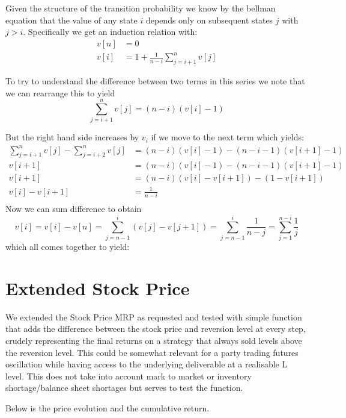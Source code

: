 \documentclass{article}[12pt]
\begin{document}
Given the structure of the transition probability we know by the bellman equation that the value of any state $i$ depends only on subsequent states $j$ with $j>i$. Specifically we get an induction relation with:
\begin{align*}
v[n] &= 0\\
v[i] &= 1 + \frac{1}{n-i}\sum_{j = i+1}^n v[j]
\end{align*}

To try to understand the difference between two terms in this series we note that we can rearrange this to yield
$$\sum_{j = i+1}^n v[j]  = (n-i)(v[i]-1)$$

But the right hand side increases by $v_i$ if we move to the next term which yields:
\begin{align*}
\sum_{j = i+1}^n v[j] - \sum_{j = i+2}^n v[j]  &= (n-i)(v[i]-1) - (n-i-1)(v[i+1]-1)\\
v[i+1] &= (n-i)(v[i]-1) -  (n-i-1)(v[i+1]-1)\\
v[i+1] &= (n-i)(v[i]-v[i+1]) - (1 - v[i+1])\\
v[i]-v[i+1] &= \frac{1}{n-i}\\
\end{align*}
Now we can sum difference to obtain  
$$ v[i] = v[i] - v[n] = \sum_{j=n-1}^{i}(v[j] -v[j+1]) = \sum_{j=n-1}^{i}\frac{1}{n-j} =  \sum_{j=1}^{n-i}\frac{1}{j}$$
which all comes together to yield:

\section{Extended Stock Price}

We extended the Stock Price MRP as requested and tested with simple function that adds the difference between the stock price and reversion level at every step, crudely representing the final returns on a strategy that always sold levels above the reversion level. This could be somewhat relevant for a party trading futures oscillation while having access to the underlying deliverable at a realisable L level. This does not take into account mark to market or inventory shortage/balance sheet shortages but serves to test the function.

Below is the price evolution and the cumulative return.
\end{document}
